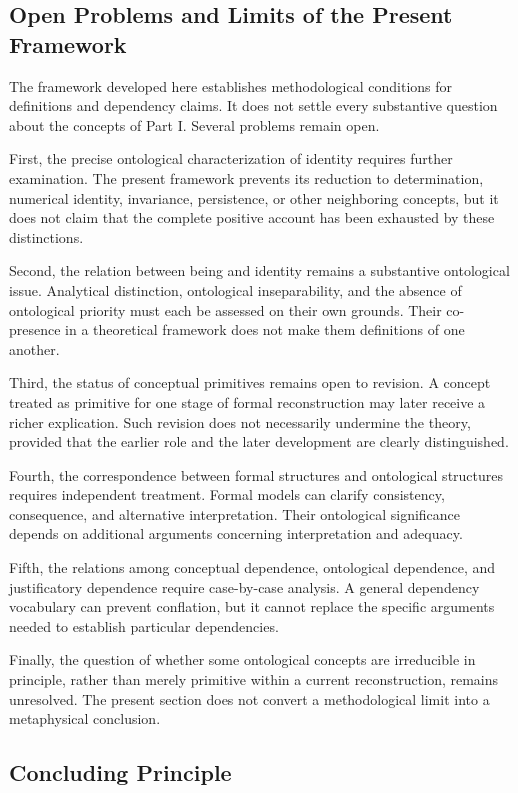 \subsection{Open Problems and Limits of the Present Framework}

The framework developed here establishes methodological
conditions for definitions and dependency claims. It does not
settle every substantive question about the concepts of Part I.
Several problems remain open.

First, the precise ontological characterization of identity
requires further examination. The present framework prevents
its reduction to determination, numerical identity, invariance,
persistence, or other neighboring concepts, but it does not
claim that the complete positive account has been exhausted
by these distinctions.

Second, the relation between being and identity remains a
substantive ontological issue. Analytical distinction,
ontological inseparability, and the absence of ontological
priority must each be assessed on their own grounds. Their
co-presence in a theoretical framework does not make them
definitions of one another.

Third, the status of conceptual primitives remains open to
revision. A concept treated as primitive for one stage of
formal reconstruction may later receive a richer explication.
Such revision does not necessarily undermine the theory,
provided that the earlier role and the later development are
clearly distinguished.

Fourth, the correspondence between formal structures and
ontological structures requires independent treatment.
Formal models can clarify consistency, consequence, and
alternative interpretation. Their ontological significance
depends on additional arguments concerning interpretation
and adequacy.

Fifth, the relations among conceptual dependence, ontological
dependence, and justificatory dependence require case-by-case
analysis. A general dependency vocabulary can prevent
conflation, but it cannot replace the specific arguments
needed to establish particular dependencies.

Finally, the question of whether some ontological concepts
are irreducible in principle, rather than merely primitive
within a current reconstruction, remains unresolved. The
present section does not convert a methodological limit into
a metaphysical conclusion.

\subsection{Concluding Principle}


